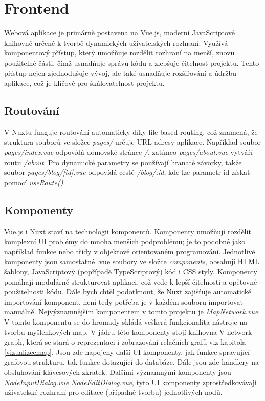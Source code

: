 \section{Frontend}
Webová aplikace je primárně postavena na Vue.js, moderní JavaScriptové knihovně určené k tvorbě dynamických uživatelských rozhraní. Využívá komponentový přístup, který umožňuje rozdělit rozhraní na menší, znovu použitelné části, čímž usnadňuje správu kódu a zlepšuje čitelnost projektu. Tento přístup nejen zjednodušuje vývoj, ale také usnadňuje rozšiřování a údržbu aplikace, což je klíčové pro škálovatelnost projektu.
\subsection{Routování}
V Nuxtu funguje routování automaticky díky file-based routing, což znamená, že struktura souborů ve složce \textit{pages/} určuje URL adresy aplikace. Například soubor \textit{pages/index.vue} odpovídá domovské stránce \textit{/}, zatímco \textit{pages/about.vue} vytváří routu \textit{/about}. Pro dynamické parametry se používají hranaté závorky, takže soubor \textit{pages/blog/[id].vue} odpovídá cestě \textit{/blog/:id}, kde lze parametr id získat pomocí \textit{useRoute()}.\cite{routing}
\subsection{Komponenty}
Vue.js i Nuxt staví na technologii komponentů.
Komponenty umožňují rozdělit komplexní UI problémy do mnoha menších podproblémů; je to podobné jako například funkce nebo třídy v objektově orientovaném programování. Jednotlivé komponenty jsou samostatné .vue soubory ve složce \textit{components}, obsahují HTML šablony, JavaScriptový (popřípadě TypeScriptový) kód i CSS styly. Komponenty pomáhají modulárně strukturovat aplikaci, což vede k lepší čitelnosti a opětovné použitelnosti kódu.\cite{component} Dále bych chtěl podotknout, že Nuxt zajišťuje automatické importování komponent, není tedy potřeba je v každém souboru importovat manuálně. \cite{nuxt-auto-import}
\newline
\newline
Nejvýznamnějším komponentem v tomto projektu je \textit{MapNetwork.vue}. V tomto komponentu se do hromady skládá veškerá funkcionalita nástroje na tvorbu myšlenkových map. V jádru této komponenty stojí knihovna V-network-graph, která se stará o reprezentaci i zobrazování relačních grafů viz kapitola \ref{vizualizcemap}. Jsou zde napojeny další UI komponenty, jak funkce spravující grafovou strukturu, tak funkce dotazující do databáze. Dále jsou zde handlery na obsluhování klávesových zkratek.
\newline
Dalšími významnými komponenty jsou \textit{NodeInputDialog.vue} \textit{NodeEditDialog.vue}, tyto UI komponenty zprostředkovávají uživatelské rozhraní pro editace (případně tvorbu) jednotlivých nodů. 

